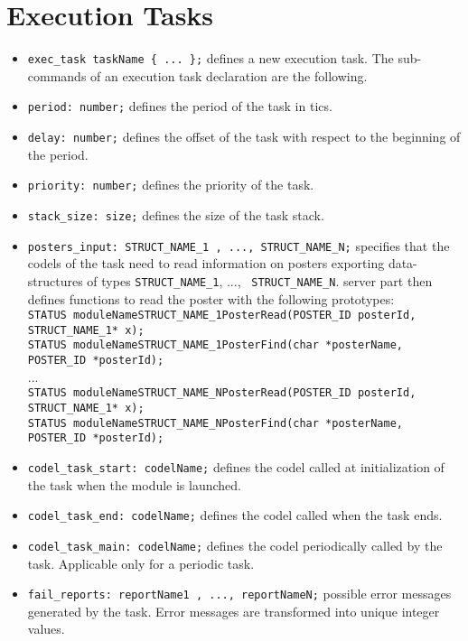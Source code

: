 \section{Execution Tasks}
\label{sec|exec-task}

\begin{itemize}
\item[]{\tt exec\_task taskName \{ ... \};} defines a new execution task. The
sub-commands of an execution task declaration are the following.

\item[]{\tt period:  number;} defines the period of the task in tics.

\item[]{\tt delay:  number;} defines the offset of the task with respect to
the beginning of the period.

\item[]{\tt priority:  number;} defines the priority of the task.

\item[]{\tt stack\_size:  size;} defines the size of the task stack.

\item[]{\tt posters\_input:  STRUCT\_NAME\_1 , ..., STRUCT\_NAME\_N;}
specifies that the codels of the task need to read information on posters exporting
data-structures of types {\tt STRUCT\_NAME\_1}, ..., {\tt
  STRUCT\_NAME\_N}. {\GenoM} server part then defines functions to read
the poster with the following prototypes:\\ {\small
{\tt STATUS moduleNameSTRUCT\_NAME\_1PosterRead(POSTER\_ID posterId,
  STRUCT\_NAME\_1* x);}\\
{\tt STATUS moduleNameSTRUCT\_NAME\_1PosterFind(char *posterName,
  POSTER\_ID *posterId);}\\
...\\
{\tt STATUS moduleNameSTRUCT\_NAME\_NPosterRead(POSTER\_ID posterId,
  STRUCT\_NAME\_1* x);}\\
{\tt STATUS moduleNameSTRUCT\_NAME\_NPosterFind(char *posterName,
  POSTER\_ID *posterId);}\\
}

\item[]{\tt codel\_task\_start:  codelName;} defines the codel called at
initialization of the task when the module is launched.

\item[]{\tt codel\_task\_end:  codelName;} defines the codel called when the task ends.

\item[]{\tt codel\_task\_main:  codelName;} defines the codel periodically
called by the task. Applicable only for a periodic task.

\item[]{\tt fail\_reports:  reportName1 , ..., reportNameN;} 
possible error messages generated by the task. Error messages are
transformed into unique integer values.
\end{itemize}
